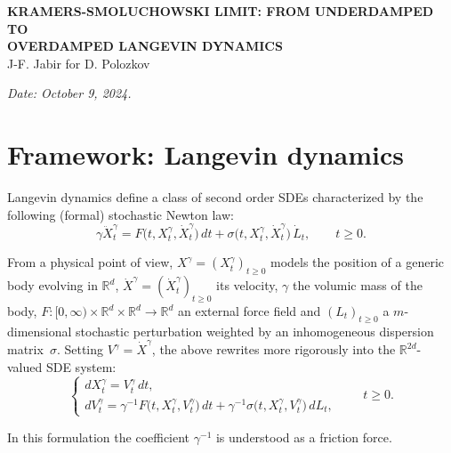 \documentclass[11pt]{article}
\theoremstyle{remark}
\begin{document}
\begin{center}
{\large\bfseries\MakeUppercase{Kramers-Smoluchowski limit: from underdamped to}}\\
{\large\bfseries\MakeUppercase{overdamped Langevin dynamics}}\\[0.5em]
{\normalsize J-F. Jabir for D. Polozkov}
\end{center}

\noindent\textit{Date: October 9, 2024.}

\section{Framework: Langevin dynamics}

Langevin dynamics define a class of second order SDEs characterized by the following (formal) stochastic Newton law:
\[
\gamma \ddot{X}_t^{\gamma} = F\bigl(t,X_t^{\gamma},\dot{X}_t^{\gamma}\bigr)\,dt + \sigma\bigl(t,X_t^{\gamma},\dot{X}_t^{\gamma}\bigr)\,\dot{L}_t,
\qquad t \ge 0.
\]

From a physical point of view, $X^{\gamma}=(X_t^{\gamma})_{t\ge0}$ models the position of a generic body evolving in $\mathbb{R}^d$,
$\dot{X}^{\gamma}=(\dot{X}_t^{\gamma})_{t\ge0}$ its velocity, $\gamma$ the volumic mass of the body,
$F:[0,\infty)\times\mathbb{R}^d\times\mathbb{R}^d\to\mathbb{R}^d$ an external force field
and $(L_t)_{t\ge0}$ a $m$-dimensional stochastic perturbation weighted by an inhomogeneous dispersion matrix~$\sigma$.
Setting $V^{\gamma}=\dot{X}^{\gamma}$, the above rewrites more rigorously into the $\mathbb{R}^{2d}$-valued SDE system:
\begin{equation}
\label{eq:1.1}
\begin{cases}
dX_t^{\gamma} = V_t^{\gamma}\,dt,\\
dV_t^{\gamma} = \gamma^{-1}F\bigl(t,X_t^{\gamma},V_t^{\gamma}\bigr)\,dt + \gamma^{-1}\sigma\bigl(t,X_t^{\gamma},V_t^{\gamma}\bigr)\,dL_t,
\end{cases}
\qquad t\ge0.
\end{equation}

In this formulation the coefficient $\gamma^{-1}$ is understood as a friction force.
\end{document}

